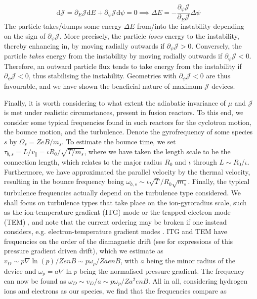 \begin{equation}
    \mathrm{d} \mathcal{J} = \partial_E \mathcal{J} \mathrm{d}E + \partial_\psi \mathcal{J} \mathrm{d}\psi =0 \implies \Delta E = - \frac{\partial_\psi \mathcal{J}}{\partial_E \mathcal{J}} \Delta \psi
\end{equation}
The particle takes/dumps some energy $\Delta E$ from/into the instability depending on the sign of $\partial_\psi \mathcal{J}$. More precisely, the particle \textit{loses} energy to the instability, thereby enhancing in, by moving radially outwards if $\partial_\psi \mathcal{J} > 0$. Conversely, the particle \textit{takes} energy from the instability by moving radially outwards if $\partial_\psi \mathcal{J} < 0$. Therefore, an outward particle flux tends to take energy from the instability if $\partial_\psi \mathcal{J} < 0$, thus stabilising the instability. Geometries with $\partial_\psi \mathcal{J} < 0$ are thus favourable, and we have shown the beneficial nature of maximum-$\mathcal{J}$ devices. \par 
Finally, it is worth considering to what extent the adiabatic invariance of $\mu$ and $\mathcal{J}$ is met under realistic circumstances, present in fusion reactors. To this end, we consider some typical frequencies found in such reactors for the cyclotron motion, the bounce motion, and the turbulence. Denote the gyrofrequency of some species $s$ by $\Omega_s = Ze B / m_s$. To estimate the bounce time, we set $\tau_{b,s} = L/v_\parallel=\iota R_0/\sqrt{T/m_s}$, where we have taken the length scale to be the connection length, which relates to the major radius $R_0$ and $\iota$ through $L\sim R_0/\iota$. Furthermore, we have approximated the parallel velocity by the thermal velocity, resulting in the bounce frequency being $\omega_{b,s}\sim \iota \sqrt{T}/R_0\sqrt{m_s}$. Finally, the typical turbulence frequencies actually depend on the turbulence type considered. We shall focus on turbulence types that take place on the ion-gyroradius scale, such as the ion-temperature gradient (ITG) mode or the trapped electron mode (TEM) \cite{helander2013collisionless,plunk2014collisionless}, and note that the current ordering may be broken if one instead considers, e.g. electron-temperature gradient modes \cite{lee1987collisionless}. ITG and TEM have frequencies on the order of the diamagnetic drift (see \citet{de2012guiding} for expressions of this pressure gradient driven drift), which we estimate as $v_D \sim p \nabla \ln(p)/ZenB \sim p \omega_p/ZaenB$, with $a$ being the minor radius of the device and $\omega_p = a\nabla \ln p$ being the normalised pressure gradient. The frequency can now be found as $\omega_D \sim v_D/a \sim p \omega_p /Za^2 e n B$. All in all, considering hydrogen ions and electrons as our species, we find that the frequencies compare as
